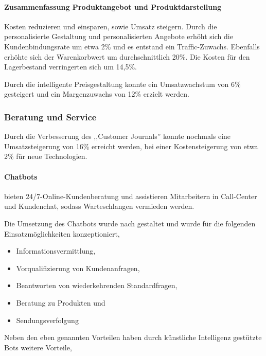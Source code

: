 \paragraph{Zusammenfassung Produktangebot und Produktdarstellung} Kosten reduzieren und einsparen, sowie Umsatz steigern. Durch die personalisierte Gestaltung und personalisierten Angebote erhöht sich die Kundenbindungsrate um etwa 2\% und es entstand ein Traffic-Zuwachs. Ebenfalls erhöhte sich der Warenkorbwert um durchschnittlich 20\%. Die Kosten für den Lagerbestand verringerten sich um 14,5\%.\vspace{0.2cm}

Durch die intelligente Preisgestaltung konnte ein Umsatzwachstum von 6\% gesteigert und ein Margenzuwachs von 12\% erzielt werden.

\subsubsection{Beratung und Service}

Durch die Verbesserung des ,,Customer Journals'' konnte nochmals eine Umsatzsteigerung von 16\% erreicht werden, bei einer Kostensteigerung von etwa 2\% für neue Technologien.

\paragraph{Chatbots} bieten 24/7-Online-Kun\-den\-be\-ra\-tung und assistieren Mitarbeitern in Call-Center und Kundenchat, sodass Warteschlangen vermieden werden.\vspace{0.2cm}

Die Umsetzung des Chatbots wurde nach \cite{chatlogue_chatbot_tasks} gestaltet und wurde für die folgenden Einsatzmöglichkeiten konzeptioniert,

\begin{itemize}
	\item Informationsvermittlung,
	\item Vorqualifizierung von Kundenanfragen,
	\item Beantworten von wiederkehrenden Standardfragen,
	\item Beratung zu Produkten und
	\item Sendungsverfolgung
\end{itemize} 

Neben den eben genannten Vorteilen haben durch künstliche Intelligenz gestützte Bots weitere Vorteile,

